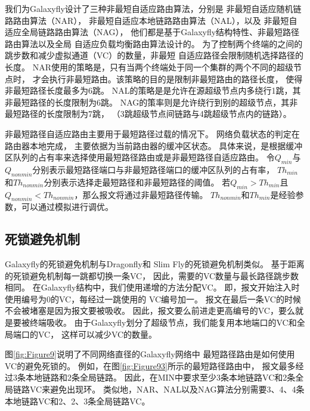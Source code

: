 我们为Galaxyfly设计了三种非最短自适应路由算法，分别是
非最短自适应随机链路路由算法（NAR），
非最短自适应本地链路路由算法（NAL），以及
非最短自适应全局链路路由算法（NAG），
他们都是基于Galaxyfly结构特性、非最短路径路由算法以及全局
自适应负载均衡路由算法设计的。
为了控制两个终端的之间的跳步数和减少虚拟通道（VC）的数量，非最短
自适应路径会限制随机选择路径的长度。
NAR使用的策略是，只有当两个终端处于同一个集群的两个不同的超级节点时，
才会执行非最短路由。该策略的目的是限制非最短路由的路径长度，
使得非最短路径长度最多为6跳。
NAL的策略是是允许在源超级节点内多绕行1跳，其非最短路径的长度限制为6跳。
NAG的策率则是允许绕行到别的超级节点，其非最短路径的长度限制为7跳，
（3跳超级节点间链路与4跳超级节点内的链路）。

非最短路径自适应路由主要用于最短路径过载的情况下。
网络负载状态的判定在路由器本地完成，
主要依据为当前路由器的缓冲区状态。
具体来说，是根据缓冲区队列的占有率来选择使用最短路径路由或是非最短路径自适应路由。
令$Q_{min}$与$Q_{nonmin}$分别表示最短路径端口与非最短路径端口的缓冲区队列的占有率，
$Th_{min}$和$Th_{nonmin}$分别表示选择走最短路径和非最短路径的阈值。
若$Q_{min}>Th_{min}$且$Q_{nonmin}<Th_{nonmin}$，那么报文将通过非最短路径传输。
$Th_{nonmin}$和$Th_{min}$是经验参数，可以通过模拟进行调优。

\subsection{死锁避免机制}

Galaxyfly的死锁避免机制与Dragonfly和
Slim Fly的死锁避免机制类似。
基于距离的死锁避免机制每一跳都切换一条VC，
因此，需要的VC数量与最长路径跳步数相同。
在Galaxyfly结构中，我们使用递增的方法分配VC。
即，报文开始注入时使用编号为0的VC，每经过一跳使用的
VC编号加一。
报文在最后一条VC的时候不会被堵塞是因为报文要被吸收。
因此，报文要么前进走更高编号的VC，要么就是要被终端吸收。
由于Galaxyfly划分了超级节点，我们能复用本地端口的VC和全局端口的VC，
这样可以减少VC的数量。

图\ref{fig:Figure9}说明了不同网络直径的Galaxyfly网络中
最短路径路由是如何使用VC的避免死锁的。
例如，在图\ref{fig:Figure93}所示的最短路径路由中，
报文最多经过3条本地链路和2条全局链路。
因此，在MIN中要求至少3条本地链路VC和2条全局链路VC来避免出现环。
类似地，NAR、NAL以及NAG算法分别需要3、4、4条本地链路VC和2、2、3条全局链路VC。

